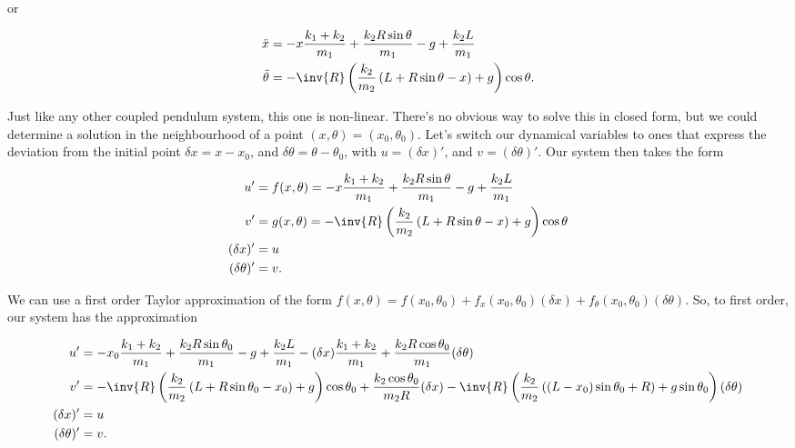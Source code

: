 or

\begin{subequations}
\label{eqn:hoopSpring:3}
\begin{align}
\ddot{x} &= 
-x \frac{k_1 + k_2}{m_1} 
+ \frac{k_2 R \sin\theta}{m_1} 
- g + \frac{k_2 L }{m_1} \\
\ddot{\theta} &= 
- \inv{R}\left( \frac{k_2}{m_2} \left( L + R \sin\theta - x \right) +g \right) \cos\theta
.
\end{align}
\end{subequations}

Just like any other coupled pendulum system, this one is non-linear.  There's no obvious way to solve this in closed form, but we could determine a solution in the neighbourhood of a point $(x, \theta) = (x_0, \theta_0)$.  Let's switch our dynamical variables to ones that express the deviation from the initial point $\delta x = x - x_0$, and $\delta \theta = \theta - \theta_0$, with $u = (\delta x)'$, and $v = (\delta \theta)'$.  Our system then takes the form

\begin{subequations}
\label{eqn:hoopSpring:4}
\begin{align}
u' &= f(x,\theta) =
-x \frac{k_1 + k_2}{m_1} 
+ \frac{k_2 R \sin\theta}{m_1} 
- g + \frac{k_2 L }{m_1} \\
v' &= g(x,\theta) =
- \inv{R}\left( \frac{k_2}{m_2} \left( L + R \sin\theta - x \right) +g \right) \cos\theta \\
(\delta x)' &= u \\
(\delta \theta)' &= v
.
\end{align}
\end{subequations}

We can use a first order Taylor approximation of the form $f(x, \theta) = f(x_0, \theta_0) + f_x(x_0,\theta_0) (\delta x) + f_\theta(x_0,\theta_0) (\delta \theta)$.  So, to first order, our system has the approximation

\begin{subequations}
\label{eqn:hoopSpring:5}
\begin{align}
u' &= 
-x_0 \frac{k_1 + k_2}{m_1} 
+ \frac{k_2 R \sin\theta_0}{m_1} 
- g + \frac{k_2 L }{m_1} 
-(\delta x) \frac{k_1 + k_2}{m_1} 
+ \frac{k_2 R \cos\theta_0}{m_1} (\delta \theta)
\\
v' &= 
- \inv{R}\left( \frac{k_2}{m_2} \left( L + R \sin\theta_0 - x_0 \right) +g \right) \cos\theta_0
+ \frac{k_2 \cos\theta_0}{m_2 R} (\delta x)
- \inv{R}\left( \frac{k_2}{m_2} \left( \left( L - x_0 \right) \sin\theta_0 + R \right) + g \sin\theta_0 \right) (\delta \theta)
\\
(\delta x)' &= u \\
(\delta \theta)' &= v
.
\end{align}
\end{subequations}

